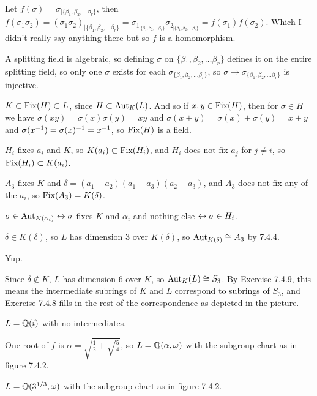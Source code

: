 \documentclass[11pt, oneside]{article}   	%
\begin{document}
\item Let $f(\sigma) = \sigma_{|\{\beta_1, \beta_2, \ldots \beta_r\}}$, then $f(\sigma_1\sigma_2) = (\sigma_1\sigma_2)_{|\{\beta_1, \beta_2, \ldots \beta_r\}} = \sigma_{1_{|\{\beta_1, \beta_2, \ldots \beta_r\}}}\sigma_{2_{|\{\beta_1, \beta_2, \ldots \beta_r\}}} = f(\sigma_1)f(\sigma_2)$. Which I didn't really say anything there but so $f$ is a homomorphism.
\item A splitting field is algebraic, so defining $\sigma$ on $\{\beta_1, \beta_2, \ldots \beta_r\}$ defines it on the entire splitting field, so only one $\sigma$ exists for each $\sigma_{\{\beta_1, \beta_2, \ldots \beta_r\}}$, so $\sigma \to \sigma_{\{\beta_1, \beta_2, \ldots \beta_r\}}$ is injective.
\ee
\item $K \subset \text{Fix}(H) \subset L$, since $H \subset \text{Aut}_K(L)$. And so if $x, y \in \text{Fix}(H)$, then for $\sigma \in H$ we have $\sigma(xy) = \sigma(x)\sigma(y) = xy$ and $\sigma(x + y) = \sigma(x) + \sigma(y) = x + y$ and $\sigma(x^{-1}) = \sigma(x)^{-1} = x^{-1}$, so $\text{Fix}(H)$ is a field.
\item \be
\item $H_i$ fixes $a_i$ and $K$, so $K(a_i) \subset \text{Fix}(H_i)$, and $H_i$ does not fix $a_j$ for $j \not= i$, so $\text{Fix}(H_i) \subset K(a_i)$.
\item $A_3$ fixes $K$ and $\delta = (a_1-a_2)(a_1-a_3)(a_2-a_3)$, and $A_3$ does not fix any of the $a_i$, so $\text{Fix}(A_3) = K(\delta)$.
\ee
\item \be
\item $\sigma \in \text{Aut}_{K(\alpha_i)} \leftrightarrow \sigma$ fixes $K$ and $\alpha_i$ and nothing else $\leftrightarrow \sigma \in H_i$.
\item $\delta \in K(\delta)$, so $L$ has dimension 3 over $K(\delta)$, so $\text{Aut}_{K(\delta)} \cong A_3$ by 7.4.4.
\item Yup.
\ee
\item Since $\delta \not \in K$, $L$ has dimension 6 over $K$, so $\text{Aut}_K(L) \cong S_3$. By Exercise 7.4.9, this means the intermediate subrings of $K$ and $L$ correspond to subrings of $S_3$, and Exercise 7.4.8 fills in the rest of the correspondence as depicted in the picture.
\item \be
\item $L=\mathbb{Q}(i)$ with no intermediates.
\item One root of $f$ is $\alpha = \sqrt{\frac{1}{2} + \sqrt{\frac{5}{4}}}$, so $L = \mathbb{Q}(\alpha, \omega)$ with the subgroup chart as in figure 7.4.2.
\item $L = \mathbb{Q}(3^{1/3}, \omega)$ with the subgroup chart as in figure 7.4.2.
\ee
\ee
\end{document}
